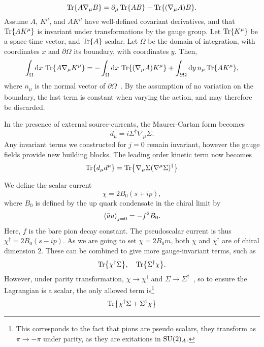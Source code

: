 \begin{equation*}
    \Tr{A \nabla_\mu B} = \partial_\mu \Tr{AB} - \Tr{(\nabla_\mu A) B}.
\end{equation*}
Assume $A$, $K^\mu$, and $A K^\mu$ have well-defined covariant derivatives, and that $\Tr{A K^\mu}$ is invariant under transformations by the gauge group.
Let $\Tr{K^\mu}$ be a space-time vector, and $\Tr{A}$ scalar. 
Let $\Omega$ be the domain of integration, with coordinates $x$ and $\partial \Omega$ its boundary, with coordinates $y$. Then, 
\begin{align*}
    \int_\Omega \dd x \, \Tr{A \nabla_\mu K^\mu} 
    = 
    - \int_\Omega \dd x \, \Tr{(\nabla_\mu A) K^\mu}
    + \int_{\partial\Omega} \dd y\, n_\mu \Tr{A K^\mu},
\end{align*}
where $n_\mu$ is the normal vector of $\partial \Omega$~\cite{Carroll:spacetime}.
By the assumption of no variation on the boundary, the last term is constant when varying the action, and may therefore be discarded.

In the presence of external source-currents, the Maurer-Cartan form becomes
\begin{equation}
    d_\mu = i \Sigma^\dagger \nabla_\mu \Sigma.
\end{equation}
Any invariant terms we constructed for $j=0$ remain invariant, however the gauge fields provide new building blocks.
The leading order kinetic term now becomes
\begin{equation}
    \label{leading order term sigma}
    \Tr{d_\mu d^\mu} = \Tr{\nabla_\mu \Sigma (\nabla^\mu \Sigma)^\dagger}
\end{equation}

We define the scalar current
\begin{equation}
    \chi = 2 B_0 (s + ip),
\end{equation}
where $B_0$ is defined by the up quark condensate in the chiral limit by
\begin{equation}
    \ex{\bar u u}_{j = 0} = - f^2 B_0.
\end{equation}
Here, $f$ is the bare pion decay constant.
The pseudoscalar current is thus $\chi^\dagger = 2 B_0 (s - ip)$.
As we are going to set $\chi = 2 B_0 m$, both $\chi$ and $\chi^\dagger$ are of chiral dimension $2$.
These can be combined to give more gauge-invariant terms, such as
\begin{equation}
    \Tr{\chi^\dagger \Sigma}, \quad \Tr{\Sigma^\dagger \chi}.
\end{equation}
However, under parity transformation, $\chi \rightarrow \chi^\dagger$ and $\Sigma \rightarrow \Sigma^\dagger$~\cite{Scherer2002IntroductionTC}, so to ensure the Lagrangian is a scalar, the only allowed term is\footnote{This corresponds to the fact that pions are pseudo scalars, they transform as $\pi \rightarrow - \pi$ under parity, as they are exitations in $\mathrm{SU}(2)_A$.}
\begin{equation}
    \label{leading order chi sigma term}
    \Tr{\chi^\dagger \Sigma + \Sigma^\dagger \chi}
\end{equation}

